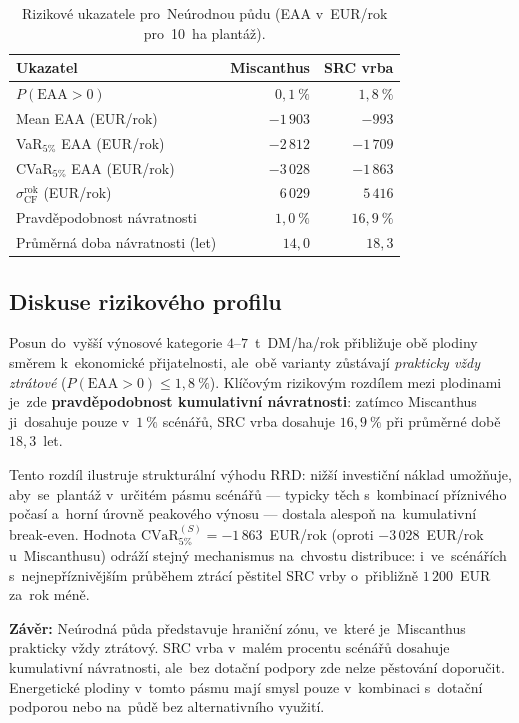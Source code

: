 \begin{table}[H]
\centering
\caption{Rizikové ukazatele pro~Neúrodnou půdu (EAA v~EUR/rok pro~10~ha plantáž).}
\label{tab:neurodna-metriky}
\renewcommand{\arraystretch}{1.15}
\begin{tabular}{lrr}
\toprule
\textbf{Ukazatel} & \textbf{Miscanthus} & \textbf{SRC vrba} \\
\midrule
$P(\mathrm{EAA} > 0)$                     & $0{,}1~\%$ & $1{,}8~\%$ \\
Mean EAA (EUR/rok)                        & $-1\,903$  & $-993$ \\
VaR$_{5\%}$ EAA (EUR/rok)                 & $-2\,812$  & $-1\,709$ \\
CVaR$_{5\%}$ EAA (EUR/rok)                & $-3\,028$  & $-1\,863$ \\
$\sigma_{\mathrm{CF}}^{\mathrm{rok}}$ (EUR/rok) & $6\,029$ & $5\,416$ \\
Pravděpodobnost návratnosti               & $1{,}0~\%$ & $16{,}9~\%$ \\
Průměrná doba návratnosti (let)           & $14{,}0$   & $18{,}3$ \\
\bottomrule
\end{tabular}
\end{table}

\subsection*{Diskuse rizikového profilu}

Posun do~vyšší výnosové kategorie $4$--$7$~t~DM/ha/rok přibližuje obě
plodiny směrem k~ekonomické přijatelnosti, ale~obě varianty zůstávají
\emph{prakticky vždy ztrátové} ($P(\mathrm{EAA}>0) \leq 1{,}8~\%$).
Klíčovým rizikovým rozdílem mezi plodinami je~zde
\textbf{pravděpodobnost kumulativní návratnosti}: zatímco Miscanthus
ji~dosahuje pouze v~$1~\%$ scénářů, SRC vrba dosahuje
\textbf{$16{,}9~\%$} při průměrné době $18{,}3$~let.

Tento rozdíl ilustruje strukturální výhodu RRD: nižší investiční náklad
umožňuje, aby~se~plantáž v~určitém pásmu scénářů --- typicky těch
s~kombinací příznivého počasí a~horní úrovně peakového výnosu --- dostala
alespoň na~kumulativní break-even. Hodnota
$\mathrm{CVaR}_{5\%}^{(S)} = -1\,863$~EUR/rok (oproti
$-3\,028$~EUR/rok u~Miscanthusu) odráží stejný mechanismus na~chvostu
distribuce: i~ve~scénářích s~nejnepříznivějším průběhem ztrácí pěstitel
SRC vrby o~přibližně $1\,200$~EUR za~rok méně.

\textbf{Závěr:} Neúrodná půda představuje hraniční zónu, ve~které je~Miscanthus
prakticky vždy ztrátový. SRC vrba v~malém procentu scénářů dosahuje
kumulativní návratnosti, ale~bez dotační podpory zde nelze pěstování
doporučit. Energetické plodiny v~tomto pásmu mají smysl pouze
v~kombinaci s~dotační podporou nebo na~půdě bez alternativního využití.


